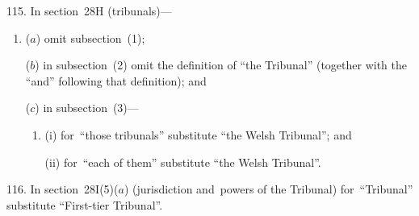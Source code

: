 \documentclass[12pt,a4paper]{article}
\begin{document}
\medskip

115.  In section~28H (tribunals)—
\begin{enumerate}\item[]
($a$) omit subsection~(1);

($b$) in subsection~(2) omit the definition of “the Tribunal” (together with the “and” following that definition); and

($c$) in subsection~(3)—
\begin{enumerate}\item[]
(i) for~“those tribunals” substitute “the Welsh Tribunal”; and

(ii) for~“each of them” substitute “the Welsh Tribunal”.
\end{enumerate}
\end{enumerate}

\medskip

116.  In section~28I(5)($a$)  (jurisdiction and~powers of the Tribunal) for~“Tribunal” substitute “First-tier Tribunal”.

\medskip
\end{document}
